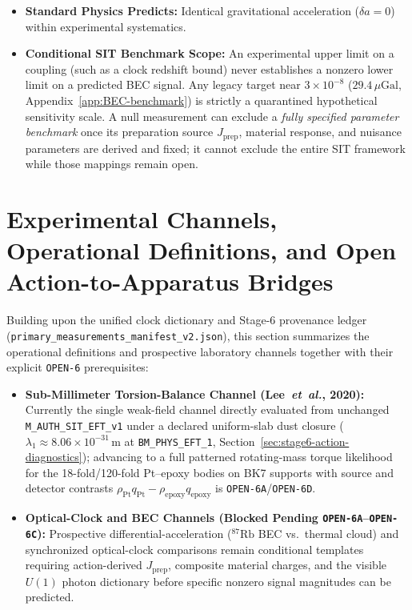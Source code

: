 \begin{itemize}
    \item \textbf{Standard Physics Predicts:} Identical gravitational acceleration ($\delta a = 0$) within experimental systematics.
    \item \textbf{Conditional SIT Benchmark Scope:} An experimental upper limit on a coupling (such as a clock redshift bound) never establishes a nonzero lower limit on a predicted BEC signal. Any legacy target near $3\times 10^{-8}$ ($29.4\,\mu\mathrm{Gal}$, Appendix~\ref{app:BEC-benchmark}) is strictly a quarantined hypothetical sensitivity scale. A null measurement can exclude a \emph{fully specified parameter benchmark} once its preparation source $J_{\mathrm{prep}}$, material response, and nuisance parameters are derived and fixed; it cannot exclude the entire SIT framework while those mappings remain open.
\end{itemize}

\section{Experimental Channels, Operational Definitions, and Open Action-to-Apparatus Bridges}
\label{sec:experimental-predictions}
\label{sec:experimental-predictions-falsifiability}

Building upon the unified clock dictionary and Stage-6 provenance ledger (\texttt{primary\_measurements\_manifest\_v2.json}), this section summarizes the operational definitions and prospective laboratory channels together with their explicit \texttt{OPEN-6} prerequisites:

\begin{itemize}
    \item \textbf{Sub-Millimeter Torsion-Balance Channel (Lee~\emph{et~al.}, 2020):} Currently the single weak-field channel directly evaluated from unchanged \texttt{M\_AUTH\_SIT\_EFT\_v1} under a declared uniform-slab dust closure ($\lambda_1 \approx 8.06\times 10^{-31}\,\mathrm{m}$ at \texttt{BM\_PHYS\_EFT\_1}, Section~\ref{sec:stage6-action-diagnostics}); advancing to a full patterned rotating-mass torque likelihood for the 18-fold/120-fold Pt--epoxy bodies on BK7 supports with source and detector contrasts $\rho_{\mathrm{Pt}} q_{\mathrm{Pt}} - \rho_{\mathrm{epoxy}} q_{\mathrm{epoxy}}$ is \texttt{OPEN-6A}/\texttt{OPEN-6D}.

    \item \textbf{Optical-Clock and BEC Channels (Blocked Pending \texttt{OPEN-6A}--\texttt{OPEN-6C}):} Prospective differential-acceleration ($^{87}\mathrm{Rb}$ BEC vs.\ thermal cloud) and synchronized optical-clock comparisons remain conditional templates requiring action-derived $J_{\mathrm{prep}}$, composite material charges, and the visible $U(1)$ photon dictionary before specific nonzero signal magnitudes can be predicted.
\end{itemize}

